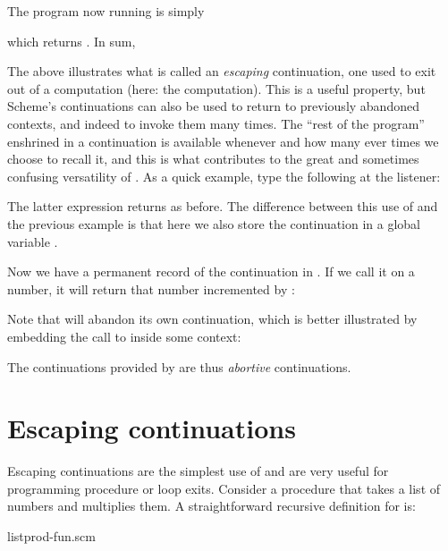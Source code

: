 
\n
The program now running is simply


\n
which returns .  In sum,


\n
The above illustrates what is called an {\em
escaping} continuation, one used to exit out of a
computation (here: the  computation).  This
is a useful property, but Scheme’s continuations can
also be used to return to previously abandoned
contexts, and indeed to invoke them many times.  The
“rest of the program” enshrined in a continuation is
available whenever and how many ever times we choose to
recall it, and this is what contributes to the great
and sometimes confusing versatility of .  As
a quick example, type the following at the listener:


\n
The latter expression returns  as before.  The
difference between this use of  and the
previous example is that here we also store the
continuation  in a global variable .

Now we have a permanent record of the continuation in
.  If we call it on a number, it will return that
number incremented by :


\n
Note that  will abandon its own continuation,
which is better illustrated by embedding the call to
 inside some context:


\n
The continuations provided by  are thus
{\em abortive} continuations.

\section{Escaping continuations}

Escaping continuations are the simplest use of
 and are very useful for programming
procedure or loop exits.  Consider a procedure
 that takes a list of numbers and
multiplies them.  A straightforward recursive
definition for  is:

\scmfilename listprod-fun.scm

